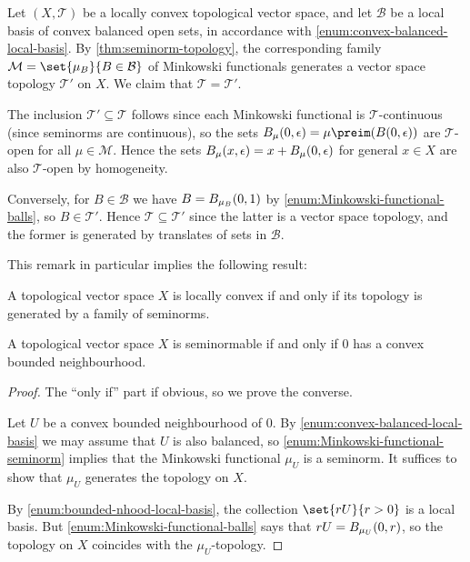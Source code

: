 \documentclass[article, a4paper, 11pt, oneside]{memoir}
\numberwithin{equation}{chapter}
\newcommand{\calT}{\mathcal{T}}
\newcommand{\calB}{\mathcal{B}}
\newcommand{\calM}{\mathcal{M}}
\begin{document}
\begin{remark}
    Let $(X,\calT)$ be a locally convex topological vector space, and let $\calB$ be a local basis of convex balanced open sets, in accordance with \cref{enum:convex-balanced-local-basis}. By \cref{thm:seminorm-topology}, the corresponding family $\calM = \set{\mu_B}{B \in \calB}$ of Minkowski functionals generates a vector space topology $\calT'$ on $X$. We claim that $\calT = \calT'$.

    The inclusion $\calT' \subseteq \calT$ follows since each Minkowski functional is $\calT$-continuous (since seminorms are continuous), so the sets $\ball[\mu]{0}{\epsilon} = \mu\preim(\ball{0}{\epsilon})$ are $\calT$-open for all $\mu \in \calM$. Hence the sets $\ball[\mu]{x}{\epsilon} = x + \ball[\mu]{0}{\epsilon}$ for general $x \in X$ are also $\calT$-open by homogeneity.

    Conversely, for $B \in \calB$ we have $B = \ball[\mu_B]{0}{1}$ by \cref{enum:Minkowski-functional-balls}, so $B \in \calT'$. Hence $\calT \subseteq \calT'$ since the latter is a vector space topology, and the former is generated by translates of sets in $\calB$.
\end{remark}
%
This remark in particular implies the following result:
%
\begin{corollary}
    A topological vector space $X$ is locally convex if and only if its topology is generated by a family of seminorms.
\end{corollary}


\begin{theorem}
    A topological vector space $X$ is seminormable if and only if $0$ has a convex bounded neighbourhood.
\end{theorem} %

\begin{proof}
    The \enquote{only if} part if obvious, so we prove the converse.

    Let $U$ be a convex bounded neighbourhood of $0$. By \cref{enum:convex-balanced-local-basis} we may assume that $U$ is also balanced, so \cref{enum:Minkowski-functional-seminorm} implies that the Minkowski functional $\mu_U$ is a seminorm. It suffices to show that $\mu_U$ generates the topology on $X$.

    By \cref{enum:bounded-nhood-local-basis}, the collection $\set{rU}{r > 0}$ is a local basis. But \cref{enum:Minkowski-functional-balls} says that $rU = \ball[\mu_U]{0}{r}$, so the topology on $X$ coincides with the $\mu_U$-topology.
\end{proof}
\end{document}

